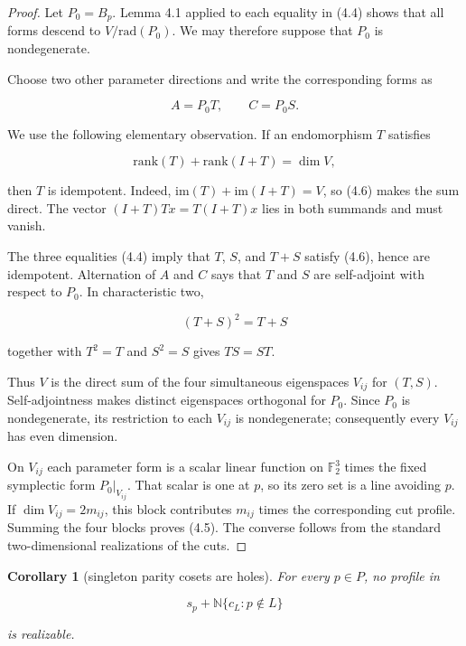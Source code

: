 \documentclass[11pt]{article}
\newtheorem{corollary}[theorem]{Corollary}
\theoremstyle{remark}
\numberwithin{equation}{section}
\begin{document}
\begin{proof}

Let $P_0=B_p$. Lemma 4.1 applied to each equality in (4.4) shows that all forms
descend to $V/\mathrm{rad}(P_0)$. We may therefore suppose that $P_0$ is
nondegenerate.

Choose two other parameter directions and write the corresponding forms as

\nopagebreak[4]
\[
A=P_0T,
\qquad
C=P_0S.
\]

We use the following elementary observation. If an endomorphism $T$ satisfies

\nopagebreak[4]
\[
\mathrm{rank}(T)+\mathrm{rank}(I+T)=\dim V,
\tag{4.6}
\]

then $T$ is idempotent. Indeed,
$\mathrm{im}(T)+\mathrm{im}(I+T)=V$, so (4.6) makes the sum direct. The vector
$(I+T)Tx=T(I+T)x$ lies in both summands and must vanish.

The three equalities (4.4) imply that $T$, $S$, and $T+S$ satisfy (4.6), hence
are idempotent. Alternation of $A$ and $C$ says that $T$ and $S$ are
self-adjoint with respect to $P_0$. In characteristic two,

\nopagebreak[4]
\[
(T+S)^2=T+S
\]

together with $T^2=T$ and $S^2=S$ gives $TS=ST$.

Thus $V$ is the direct sum of the four simultaneous eigenspaces $V_{ij}$ for
$(T,S)$. Self-adjointness makes distinct eigenspaces orthogonal for $P_0$.
Since $P_0$ is nondegenerate, its restriction to each $V_{ij}$ is
nondegenerate; consequently every $V_{ij}$ has even dimension.

On $V_{ij}$ each parameter form is a scalar linear function on
$\mathbb F_2^3$ times the fixed symplectic form $P_0|_{V_{ij}}$. That scalar is
one at $p$, so its zero set is a line avoiding $p$. If
$\dim V_{ij}=2m_{ij}$, this block contributes $m_{ij}$ times the corresponding
cut profile. Summing the four blocks proves (4.5). The converse follows from
the standard two-dimensional realizations of the cuts.
\end{proof}


\Needspace{0.28\textheight}
\begin{corollary}[singleton parity cosets are holes]

For every $p\in P$, no profile in

\nopagebreak[4]
\[
s_p+\mathbb N\{c_L:p\notin L\}
\tag{4.7}
\]

is realizable.

\end{corollary}
\end{document}
